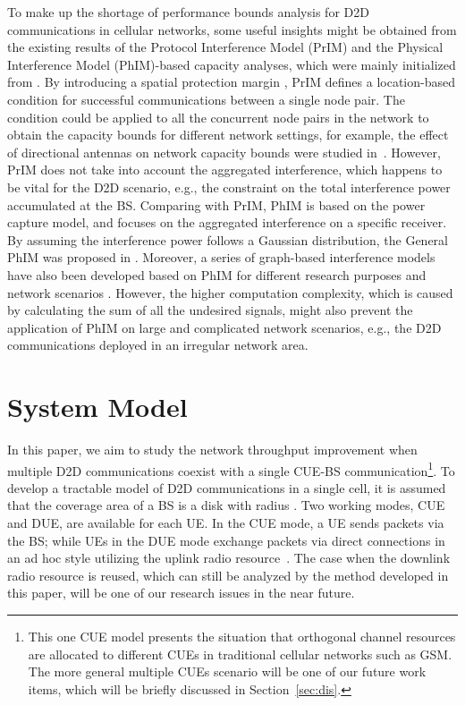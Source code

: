 \documentclass[journal, 10pt]{IEEEtran}
\begin{document}
To make up the shortage of performance bounds analysis for D2D
communications in cellular networks, some useful insights might be
obtained from the existing results of the Protocol Interference Model
(PrIM) and the Physical Interference Model (PhIM)-based capacity
analyses, which were mainly initialized from \cite{Gupta:2000ht}. By
introducing a spatial protection margin , PrIM defines a
location-based condition for successful communications between a
single node pair. The condition could be applied to all the concurrent
node pairs in the network to obtain the capacity bounds for different
network settings, for example, the effect of directional antennas on
network capacity bounds were studied in~\cite{Yi:2003wh}. However,
PrIM does not take into account the aggregated interference, which
happens to be vital for the D2D scenario, e.g., the constraint on the
total interference power accumulated at the BS. Comparing with PrIM,
PhIM is based on the power capture model, and focuses on the
aggregated interference on a specific receiver. By assuming the
interference power follows a Gaussian distribution, the General PhIM
was proposed in \cite{Agarwal:2004vz}. Moreover, a series of
graph-based interference models have also been developed based on PhIM
for different research purposes and network scenarios
\cite{Brar:2006uu,Kim:2007fv}. However, the higher computation
complexity, which is caused by calculating the sum of all the
undesired signals, might also prevent the application of PhIM on large
and complicated network scenarios, e.g., the D2D communications
deployed in an irregular network area.


\section{System Model}\label{sec:sysMod}

In this paper, we aim to study the network throughput improvement when
multiple D2D communications coexist with a single CUE-BS
communication\footnote{This one CUE model presents the situation that
orthogonal channel resources are allocated to different CUEs in
traditional cellular networks such as GSM. The more general multiple
CUEs scenario will be one of our future work items, which will be
briefly discussed in Section~\ref{sec:dis}.}. To develop a tractable
model of D2D communications in a single cell, it is assumed that the
coverage area of a BS is a disk with radius . Two
working modes, CUE and DUE, are available for each UE. In the CUE
mode, a UE sends packets via the BS; while UEs in the DUE mode
exchange packets via direct connections in an ad hoc style utilizing
the uplink radio resource~\cite{Doppler:09MCom}. The case when the
downlink radio resource is reused, which can still be analyzed by the
method developed in this paper, will be one of our research issues in
the near future.
\end{document}
